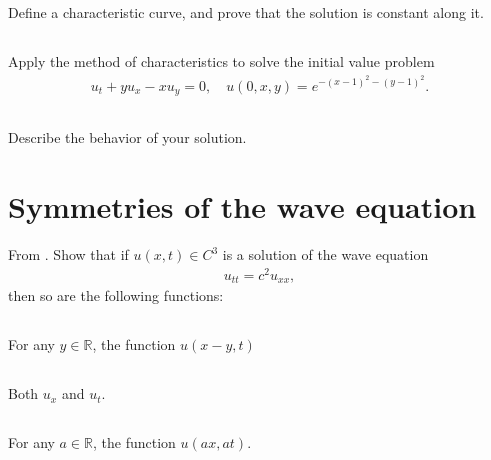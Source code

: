 \documentclass[11pt,letterpaper]{article}
\begin{document}
\subsection{}
Define a characteristic curve, and prove that the solution is constant along it.

\subsection{}
Apply the method of characteristics to solve the initial value problem
\begin{align}
    u_t+yu_x-xu_y = 0, \quad u(0,x,y) = e^{-(x-1)^2-(y-1)^2}.
\end{align}

\subsection{}
Describe the behavior of your solution.

\section{Symmetries of the wave equation}
From \cite[Excercise 4.3]{ShearerLevy_15}. Show that if $u(x,t)\in C^3$ is a solution of the wave equation
\begin{align}
    u_{tt} = c^2u_{xx},
\end{align}
then so are the following functions:

\subsection{}
For any $y\in\mathbb{R}$, the function $u(x-y,t)$

\subsection{}
Both $u_x$ and $u_t$.

\subsection{}
For any $a\in\mathbb{R}$, the function $u(ax,at)$. 

    
\vfill
\printbibliography
\end{document}
